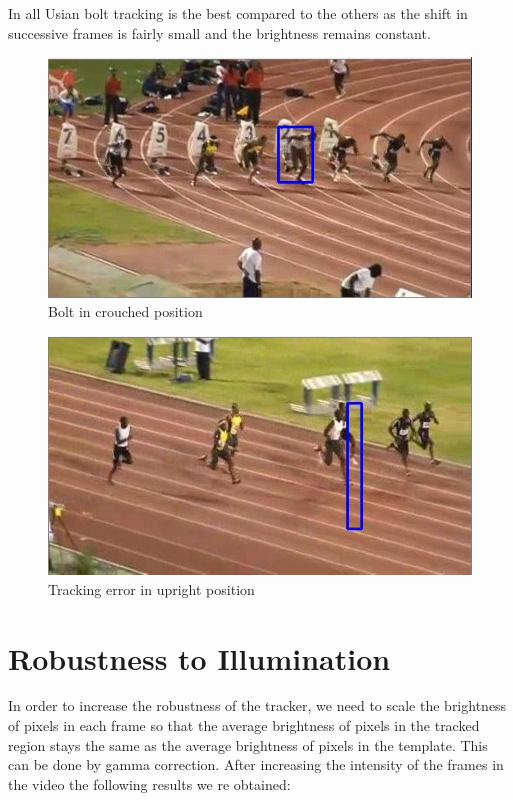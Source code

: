 \documentclass[12pt]{article}
\begin{document}
In all Usian bolt tracking is the best compared to the others as the shift in successive frames is fairly small and the brightness remains constant.
\newpage
\begin{figure}[h]
    \centering
    \includegraphics[width=12cm]{trackbolt3}
    \caption{Bolt in crouched position}
    \label{fig:Bolt in crouched position}
\end{figure}
\begin{figure}[h]
    \centering
    \includegraphics[width=12cm]{trackbolt4}
    \caption{Tracking error in upright position}
    \label{fig:Tracking error in upright position}
\end{figure}

\section{Robustness to Illumination}
In order to increase the robustness of the tracker, we need to scale the brightness of pixels in each frame so that the average brightness of pixels in the tracked region stays the same as the average brightness of pixels in the template. This can be done by gamma correction.
After increasing the intensity of the frames in the video the following results we re obtained:\\
\end{document}
